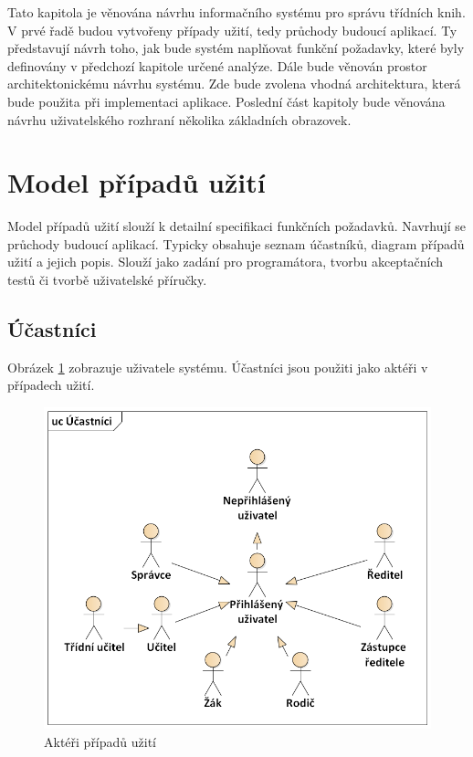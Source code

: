Tato kapitola je věnována návrhu informačního systému pro správu třídních knih. V prvé řadě budou vytvořeny případy užití, tedy průchody budoucí aplikací. Ty představují návrh toho, jak bude systém naplňovat funkční požadavky, které byly definovány v předchozí kapitole určené analýze. Dále bude věnován prostor architektonickému návrhu systému. Zde bude zvolena vhodná architektura, která bude použita při implementaci aplikace. Poslední část kapitoly bude věnována návrhu uživatelského rozhraní několika základních obrazovek.

\section{Model případů užití}
Model případů užití slouží k detailní specifikaci funkčních požadavků. Navrhují se průchody budoucí aplikací. Typicky obsahuje seznam účastníků, diagram případů užití a jejich popis. Slouží jako zadání pro programátora, tvorbu akceptačních testů či tvorbě uživatelské příručky. \cite{pripady-uziti-prednaska}
\clearpage
\subsection{Účastníci}
Obrázek \ref{ucastnici} zobrazuje uživatele systému. Účastníci jsou použiti jako aktéři v případech užití.

\begin{figure}[h]
	\centering
	\includegraphics[width=\textwidth]{images/ucastnici.png}
	\caption{Aktéři případů užití}
	\label{ucastnici}
\end{figure}

